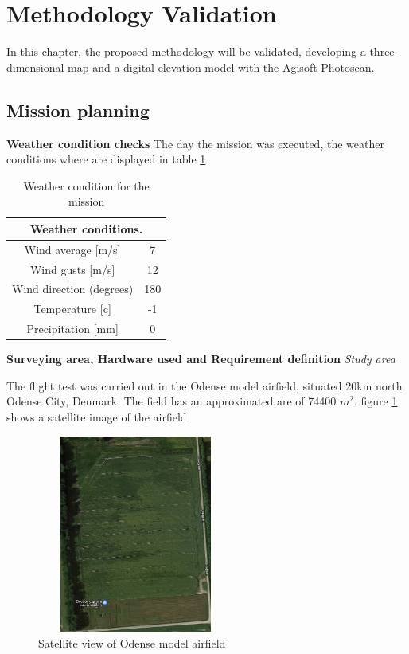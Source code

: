 \section{Methodology Validation}
In this chapter, the proposed methodology will be validated, developing a three-dimensional map and a digital elevation model with the Agisoft Photoscan.
\subsection{Mission planning}
\textbf{Weather condition checks}\newline
The day the mission was executed, the weather conditions where are  displayed in table \ref{Table:Weather}
\begin{table}[H]
\centering
\begin{tabular}{|c|c|}
\hline
\multicolumn{2}{|c|}{Weather conditions.} \\ \hline
Wind average {[}m/s{]}         & 7        \\ \hline
Wind gusts {[}m/s{]}           & 12       \\ \hline
Wind direction (degrees)       & 180      \\ \hline
Temperature {[}c{]}            & -1       \\ \hline
Precipitation {[}mm{]}         & 0        \\ \hline
\end{tabular}
\caption{Weather condition for the mission}
\label{Table:Weather}
\end{table}
\textbf{Surveying area, Hardware used and Requirement definition}\newline
\textit{Study area}

The flight test was carried out in the Odense model airfield, situated 20km north Odense City, Denmark. The field has an approximated are of  74400 $m^2$. figure \ref{fig:Airfield} shows a satellite image of the airfield
\begin{figure}[H]
\centering
\includegraphics[width=6.5cm,height=6.5cm,keepaspectratio]{imagenes/Satellite.png}
\caption{Satellite view of Odense model airfield}
\label{fig:Airfield}
\end{figure}

